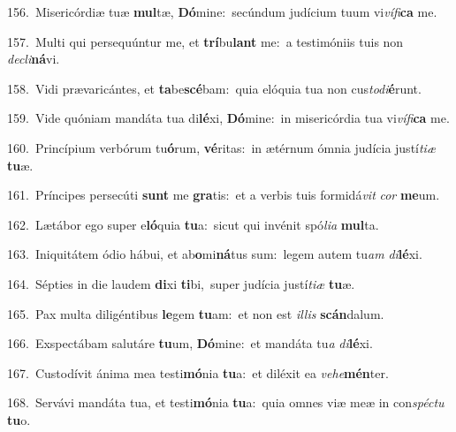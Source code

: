 {\numbfont\textcolor{\numbcolor}{156.}}~Misericórdiæ tuæ \textbf{mul}\-tæ, \textbf{Dó}\-mine:~\star secúndum judícium tuum vi\-\textit{ví}\-\textit{fi}\textbf{ca} me.\par
{\numbfont\textcolor{\numbcolor}{157.}}~Multi qui persequúntur me, et \textbf{trí}\-bu\textbf{lant} me:~\star a testimóniis tuis non \textit{de}\-\textit{cli}\textbf{ná}vi.\par
{\numbfont\textcolor{\numbcolor}{158.}}~Vidi prævaricántes, et \textbf{ta}\-be\-\textbf{scé}\-bam:~\star quia elóquia tua non cus\-\textit{to}\-\textit{di}\textbf{é}runt.\par
{\numbfont\textcolor{\numbcolor}{159.}}~Vide quóniam mandáta tua di\-\textbf{lé}\-xi, \textbf{Dó}\-mine:~\star in misericórdia tua vi\-\textit{ví}\-\textit{fi}\textbf{ca} me.\par
{\numbfont\textcolor{\numbcolor}{160.}}~Princípium verbórum tu\-\textbf{ó}\-rum, \textbf{vé}\-ritas:~\star in ætérnum ómnia judícia justí\-\textit{ti}\-\textit{æ} \textbf{tu}\-æ.\par
{\numbfont\textcolor{\numbcolor}{161.}}~Príncipes persecúti \textbf{sunt} me \textbf{gra}\-tis:~\star et a verbis tuis formidá\textit{vit} \textit{cor} \textbf{me}\-um.\par
{\numbfont\textcolor{\numbcolor}{162.}}~Lætábor ego super e\-\textbf{ló}\-quia \textbf{tu}\-a:~\star sicut qui invénit spó\-\textit{li}\-\textit{a} \textbf{mul}\-ta.\par
{\numbfont\textcolor{\numbcolor}{163.}}~Iniquitátem ódio hábui, et ab\-\textbf{o}\-mi\-\textbf{ná}\-tus sum:~\star legem autem tu\textit{am} \textit{di}\-\textbf{lé}xi.\par
{\numbfont\textcolor{\numbcolor}{164.}}~Sépties in die laudem \textbf{di}\-xi \textbf{ti}\-bi,~\star super judícia justí\-\textit{ti}\-\textit{æ} \textbf{tu}\-æ.\par
{\numbfont\textcolor{\numbcolor}{165.}}~Pax multa diligéntibus \textbf{le}\-gem \textbf{tu}\-am:~\star et non est \textit{il}\-\textit{lis} \textbf{scán}\-dalum.\par
{\numbfont\textcolor{\numbcolor}{166.}}~Exspectábam salutáre \textbf{tu}\-um, \textbf{Dó}\-mine:~\star et mandáta tu\textit{a} \textit{di}\-\textbf{lé}xi.\par
{\numbfont\textcolor{\numbcolor}{167.}}~Custodívit ánima mea testi\-\textbf{mó}\-nia \textbf{tu}\-a:~\star et diléxit ea \textit{ve}\-\textit{he}\textbf{mén}ter.\par
{\numbfont\textcolor{\numbcolor}{168.}}~Servávi mandáta tua, et testi\-\textbf{mó}\-nia \textbf{tu}\-a:~\star quia omnes viæ meæ in con\-\textit{spéc}\-\textit{tu} \textbf{tu}\-o.\par
